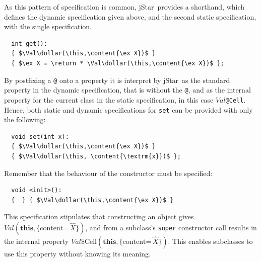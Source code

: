 \documentclass[11pt]{article}
\newcommand{\jStar}{{\sf jStar}}
\newcommand{\Val}{\mathit{Val}}
\newcommand{\ex}[1]{\mathord{\hat{#1}}}
\newcommand{\content}[1]{\{\text{content=} \, #1 \}}
\newcommand{\this}{\mathbf{this}}
\newcommand{\return}{\mathbf{return}}
\newcommand{\dollar}{\mbox{\$}}
\def\J{\lstinline}
\newcommand{\JS}[1]{$\mathit{#1}$}
\begin{document}
As this pattern of specification is common, \jStar \ provides a shorthand,
which defines the dynamic specification given above, and the second
static specification, with the single specification.
%
\begin{lstlisting}
  int get(): 
  { $\Val\dollar(\this,\content{\ex X})$ } 
  { $\ex X = \return * \Val\dollar(\this,\content{\ex X})$ };
\end{lstlisting}
By postfixing a \J~@~ onto a property it is interpret by \jStar \ as the
standard property in the dynamic specification, that is without the
\J~@~, and as the internal property for the current class in the
static specification, in this case \JS{Val}\J~@Cell~.
%
Hence, both static and dynamic specifications for \J~set~  can be provided with only the following: 
\begin{lstlisting}
  void set(int x): 
  { $\Val\dollar(\this,\content{\ex X})$ } 
  { $\Val\dollar(\this, \content{\textrm{x}})$ };
\end{lstlisting}
Remember that the behaviour of the constructor must be specified:
%
\begin{lstlisting}
  void <init>(): 
  {  } { $\Val\dollar(\this,\content{\ex X})$ }
\end{lstlisting}
This specification stipulates that constructing an object gives
$\Val(\this,\content{\ex X})$, and from a subclass's \J~super~
constructor call results in the internal property
$\Val\mbox{\$Cell}(\this,\content{\ex X})$.  This enables subclasses
to use this property without knowing its meaning.
\end{document}
